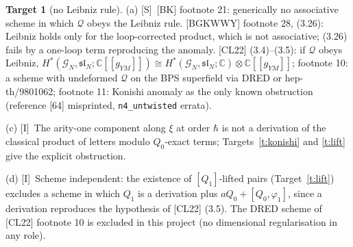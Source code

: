 \documentclass[11pt]{article}
\theoremstyle{definition}
\newtheorem{target}{Target}
\newcommand{\Sl}{\textup{[S]}}
\newcommand{\Il}{\textup{[I]}}
\begin{document}
\begin{target}[no Leibniz rule]\label{t:leibniz}
(a) \Sl\ [BK] footnote 21: generically no associative scheme in which $\mathcal Q$ obeys the Leibniz rule. [BGKWWY] footnote 28, (3.26): Leibniz holds only for the loop-corrected product, which is not associative; (3.26) fails by a one-loop term reproducing the anomaly. [CL22] (3.4)--(3.5): if $\mathcal Q$ obeys Leibniz, $H^*(\mathcal G_N,\mathfrak{sl}_N;\mathbb C[[g_{YM}]])\cong H^*(\mathcal G_N,\mathfrak{sl}_N;\mathbb C)\otimes\mathbb C[[g_{YM}]]$; footnote 10: a scheme with undeformed $\mathcal Q$ on the BPS superfield via DRED or hep-th/9801062; footnote 11: Konishi anomaly as the only known obstruction (reference [64] misprinted, \texttt{n4\_untwisted} errata).

(c) \Il\ The arity-one component along $\xi$ at order $\hbar$ is not a derivation of the classical product of letters modulo $Q_0$-exact terms; Targets~\ref{t:konishi} and \ref{t:lift} give the explicit obstruction.

(d) \Il\ Scheme independent: the existence of $[Q_1]$-lifted pairs (Target~\ref{t:lift}) excludes a scheme in which $Q_1$ is a derivation plus $aQ_0+[Q_0,\varphi_1]$, since a derivation reproduces the hypothesis of [CL22] (3.5). The DRED scheme of [CL22] footnote 10 is excluded in this project (no dimensional regularisation in any role).
\end{target}
\end{document}
